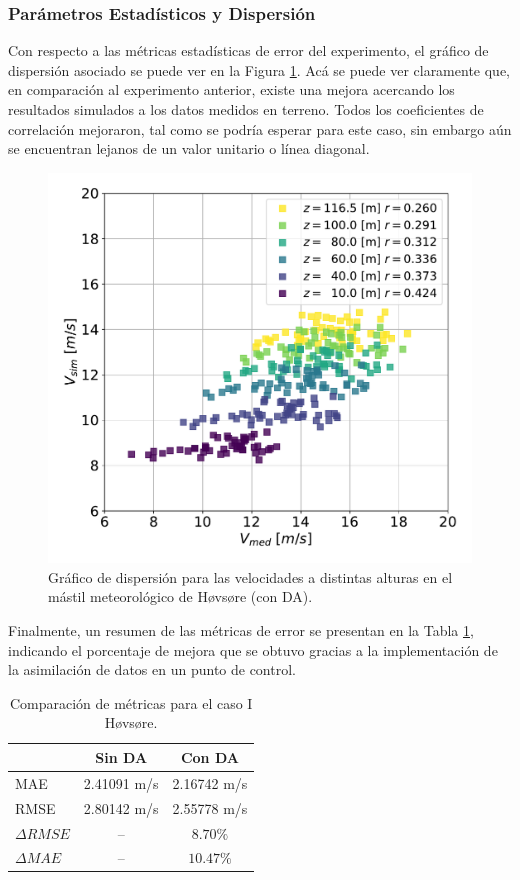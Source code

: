 \subsubsection{Parámetros Estadísticos y Dispersión}
Con respecto a las métricas estadísticas de error del experimento, el gráfico de dispersión asociado se puede ver en la Figura \ref{fig:06_corr_hov_da}. Acá se puede ver claramente que, en comparación al experimento anterior, existe una mejora acercando los resultados simulados a los datos medidos en terreno. Todos los coeficientes de correlación mejoraron, tal como se podría esperar para este caso, sin embargo aún se encuentran lejanos de un valor unitario o línea diagonal.
\begin{figure}[H]
	\centering
	\includegraphics[width=0.55\linewidth,page=1,trim={0cm 0cm 0cm 0cm},clip]{Imagenes/06/hov_da/corr}%
	\caption{Gráfico de dispersión para las velocidades a distintas alturas en el mástil meteorológico de Høvsøre (con DA).}
	\label{fig:06_corr_hov_da}
\end{figure}

Finalmente, un resumen de las métricas de error se presentan en la Tabla \ref{tab:06_hov_mae_rmse}, indicando el porcentaje de mejora que se obtuvo gracias a la implementación de la asimilación de datos en un punto de control.

\begin{table}[H]
	\caption{Comparación de métricas para el caso I Høvsøre.}
	\label{tab:06_hov_mae_rmse}
	\centering%
	\begin{tabular}{lcc}
		\toprule
		& Sin DA & Con DA \\
		\midrule
		MAE & 2.41091 m/s & 2.16742 m/s \\
		RMSE & 2.80142 m/s& 2.55778 m/s\\
		$\Delta{RMSE}$& --  & $8.70\%$  \\
		$\Delta{MAE}$ & -- & $10.47\%$  \\
		\bottomrule
	\end{tabular}
\end{table}

















